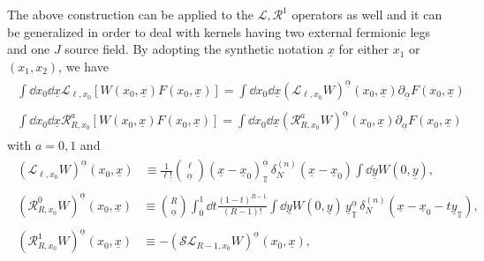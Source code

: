 \documentclass[a4paper, 11pt]{article}
\newcommand{\loc}{\mathcal{L}}								%
\newcommand{\kloc}{\mathscr{L}}								%
\newcommand{\ren}{\mathcal{R}}								%
\newcommand{\kren}{\mathscr{R}}								%
\newcommand{\torus}{{\scriptstyle{\mathbb{T}}}}				%
\theoremstyle{thm}
\begin{document}
The above construction can be applied to the $\loc, \ren^1$ operators as well and it can be generalized in order to deal with kernels having two external fermionic legs and one $J$ source field. By adopting the synthetic notation $\underline{x}$ for either $x_1$ or $(x_1, x_2)$, we have
\begin{align}
\begin{split}
\int \dd{x_0} \dd{\underline{x}} \loc_{\ell, x_0} [W(x_0, \underline{x}) F(x_0, \underline{x})] = \int \dd{x_0} \dd{\underline{x}} (\kloc_{\ell, x_0} W)^{\underline{\alpha}}(x_0, \underline{x}) \partial_{\underline{\alpha}} F(x_0, \underline{x})
\end{split} \\
\begin{split}
\label{eq:renormalization_kernel_action}
\int \dd{x_0} \dd{\underline{x}} \ren^a_{R, x_0} [W(x_0, \underline{x}) F(x_0, \underline{x})] = \int \dd{x_0} \dd{\underline{x}} (\kren^a_{R, x_0} W)^{\underline{\alpha}}(x_0, \underline{x})  \partial_{\underline{\alpha}} F(x_0, \underline{x})
\end{split}
\end{align}
with $a = 0, 1$ and
\begin{subequations}
\begin{align}
\begin{split}
\label{eq:loc_kernel_general}
(\kloc_{\ell, x_0} W)^{\underline{\alpha}}(x_0, \underline{x}) & \equiv \frac{1}{\ell!} \binom{\ell}{\underline{\alpha}} (\underline{x} - \underline{x}_0)^{\underline{\alpha}}_\torus \, \delta_N^{(n)}(\underline{x} - \underline{x}_0) \int \dd{\underline{y}} W(0, \underline{y}),
\end{split}
\\
\begin{split}
\label{eq:ren_taylor_kernel_general}
(\kren_{R, x_0}^0 W)^{\underline{\alpha}}(x_0, \underline{x}) & 
\equiv \binom{R}{\underline{\alpha}} \int_0^1 \dd{t} \frac{(1-t)^{R-1}}{(R-1)!} \int \dd{\underline{y}} W(0, \underline{y}) \, \underline{y}^{\underline{\alpha}}_\torus \, \delta^{(n)}_N(\underline{x} - \underline{x}_0 - t \underline{y}_\torus),
\end{split}
\\
\begin{split}
\label{eq:ren_zero_mass_kernel_general}
(\kren_{R, x_0}^1 W)^{\underline{\alpha}}(x_0, \underline{x}) & \equiv -(\mathscr{S}\kloc_{R-1, x_0} W)^{\underline{\alpha}}(x_0, \underline{x}),
\end{split}
\end{align}
\end{subequations}
\end{document}
